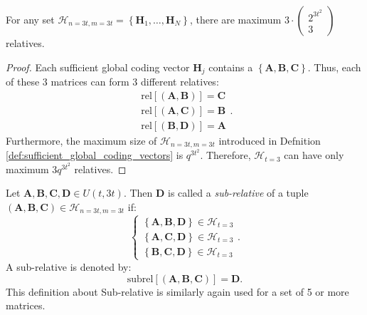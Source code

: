 \begin{lem}
For any set $\mathcal{H}_{n=3t,m=3t}=\left\{ \boldsymbol{H}_{1},\ldots,\boldsymbol{H}_{N}\right\} $,
there are maximum $3\cdot\left(\begin{array}{c}
2^{3t^{2}}\\
3
\end{array}\right)$ relatives. \label{lem:num_of_relatives}
\end{lem}
\begin{proof}
Each sufficient global coding vector $\boldsymbol{H}_{j}$ contains
a $\left\{ \boldsymbol{A},\boldsymbol{B},\boldsymbol{C}\right\} $.
Thus, each of these 3 matrices can form 3 different relatives:
\[
\begin{array}{c}
\mathrm{rel}\left[\left(\boldsymbol{A},\boldsymbol{B}\right)\right]=\boldsymbol{C}\\
\mathrm{rel}\left[\left(\boldsymbol{A},\boldsymbol{C}\right)\right]=\boldsymbol{B}\\
\mathrm{rel}\left[\left(\boldsymbol{B},\boldsymbol{D}\right)\right]=\boldsymbol{A}
\end{array}.
\]
Furthermore, the maximum size of $\mathcal{H}_{n=3t,m=3t}$ introduced
in Defnition \ref{def:sufficient_global_coding_vectors} is $q^{3t^{2}}$.
Therefore, $\mathcal{H}_{t=3}$ can have only maximum $3q^{3t^{2}}$
relatives.
\end{proof}
\begin{defn}
 Let $\boldsymbol{A},\boldsymbol{B},\boldsymbol{C},\boldsymbol{D}\in U(t,3t)$.
Then $\boldsymbol{D}$ is called a \textit{sub-relative} of a tuple
$\left(\boldsymbol{A},\boldsymbol{B},\boldsymbol{C}\right)\in\mathcal{H}_{n=3t,m=3t}$
if:
\[
\left\{ \begin{array}{c}
\left\{ \boldsymbol{A},\boldsymbol{B},\boldsymbol{D}\right\} \in\mathcal{H}_{t=3}\\
\left\{ \boldsymbol{A},\boldsymbol{C},\boldsymbol{D}\right\} \in\mathcal{H}_{t=3}\\
\left\{ \boldsymbol{B},\boldsymbol{C},\boldsymbol{D}\right\} \in\mathcal{H}_{t=3}
\end{array}\right..
\]
A sub-relative is denoted by: 
\[
\mathrm{subrel}\left[\left(\boldsymbol{A},\boldsymbol{B},\boldsymbol{C}\right)\right]=\boldsymbol{D}.
\]
This definition about Sub-relative is similarly again used for a set
of 5 or more matrices.
\end{defn}

